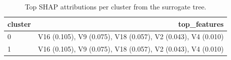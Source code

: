 \begin{table}[htbp]
\centering
\begin{tabular}{lr}
\toprule
cluster & top\_features \\
\midrule
0 & V16 (0.105), V9 (0.075), V18 (0.057), V2 (0.043), V4 (0.010) \\
1 & V16 (0.105), V9 (0.075), V18 (0.057), V2 (0.043), V4 (0.010) \\
\bottomrule
\end{tabular}
\caption{Top SHAP attributions per cluster from the surrogate tree.}
\label{tab:shap}
\end{table}
